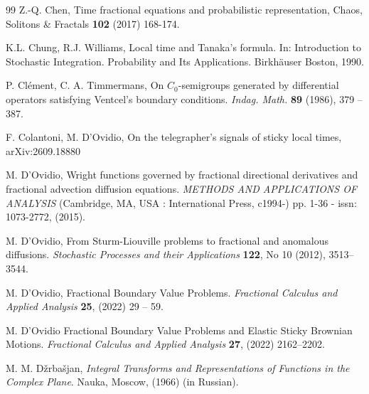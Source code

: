 \documentclass[11pt,a4paper]{article}
\newcommand{\magenta}{black}
\begin{document}
\begin{thebibliography}{99}
{Z.-Q. Chen,} 
{Time fractional equations and probabilistic representation,} 
Chaos, Solitons \& Fractals {\bf 102} (2017)  168-174.

{\color{\magenta}
K.L. Chung, R.J. Williams, 
Local time and Tanaka’s formula. 
In: Introduction to Stochastic Integration. Probability and Its Applications. Birkh\"{a}user Boston, 1990.
}

P. Cl\'{e}ment, C. A. Timmermans, 
On $C_0$-semigroups generated by differential operators satisfying Ventcel’s boundary conditions.
\textit{Indag. Math.} {\bf 89} (1986), 379 -- 387.


{\color{\magenta}
F. Colantoni, M. D'Ovidio,
On the telegrapher's signals of sticky local times, 
arXiv:2609.18880

M. D'Ovidio,
Wright functions governed by fractional directional derivatives and fractional advection diffusion equations.
\textit{METHODS AND APPLICATIONS OF ANALYSIS} (Cambridge, MA, USA : International Press, c1994-) pp. 1-36 - issn: 1073-2772, (2015).
}


%

M. D'Ovidio,
From Sturm-Liouville problems to fractional and anomalous diffusions.
\textit{Stochastic Processes and their Applications} \textbf{122}, No 10 (2012), 3513--3544.


M. D'Ovidio,
Fractional Boundary Value Problems.
\textit{Fractional Calculus and Applied Analysis} {\bf 25}, (2022) 29 -- 59.


M. D'Ovidio
Fractional Boundary Value Problems and Elastic Sticky Brownian Motions.
\textit{Fractional Calculus and Applied Analysis} {\bf 27}, (2022) 2162--2202.

%

M. M. D\v{z}rba\v{s}jan, 
\textit{Integral Transforms and Representations of Functions in the Complex Plane}.
Nauka, Moscow, (1966) (in Russian).


\end{thebibliography}
\end{document}
